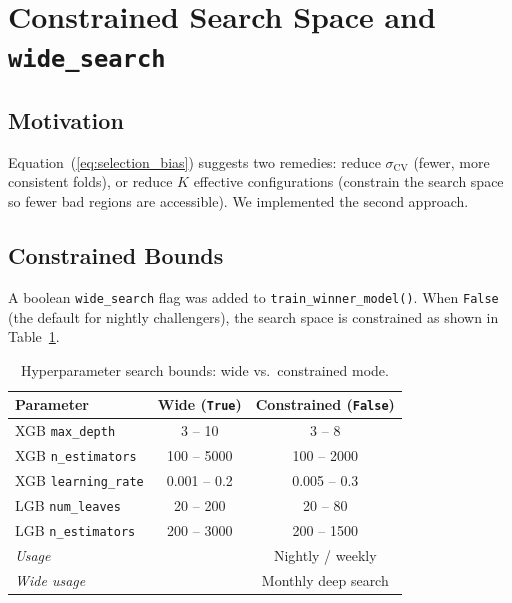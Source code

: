 \documentclass[conference]{IEEEtran}
\begin{document}
\section{Constrained Search Space and \texttt{wide\_search}}
\label{sec:constrained}

\subsection{Motivation}

Equation~(\ref{eq:selection_bias}) suggests two remedies: reduce
$\sigma_\text{CV}$ (fewer, more consistent folds), or reduce
$K$ effective configurations (constrain the search space so fewer
bad regions are accessible).  We implemented the second approach.

\subsection{Constrained Bounds}

A boolean \texttt{wide\_search} flag was added to
\texttt{train\_winner\_model()}.  When \texttt{False} (the default
for nightly challengers), the search space is constrained as shown
in Table~\ref{tab:constrained}.

\begin{table}[t]
\centering
\caption{Hyperparameter search bounds: wide vs.\ constrained mode.}
\label{tab:constrained}
\small
\begin{tabular}{lcc}
\toprule
\textbf{Parameter} & \textbf{Wide (\texttt{True})} & \textbf{Constrained (\texttt{False})} \\
\midrule
XGB \texttt{max\_depth}       & 3 -- 10     & 3 -- 8      \\
XGB \texttt{n\_estimators}    & 100 -- 5000 & 100 -- 2000 \\
XGB \texttt{learning\_rate}   & 0.001 -- 0.2 & 0.005 -- 0.3\\
LGB \texttt{num\_leaves}      & 20 -- 200   & 20 -- 80    \\
LGB \texttt{n\_estimators}    & 200 -- 3000 & 200 -- 1500 \\
\midrule
\multicolumn{2}{l}{\textit{Usage}} & Nightly / weekly \\
\multicolumn{2}{l}{\textit{Wide usage}} & Monthly deep search \\
\bottomrule
\end{tabular}
\end{table}
\end{document}
